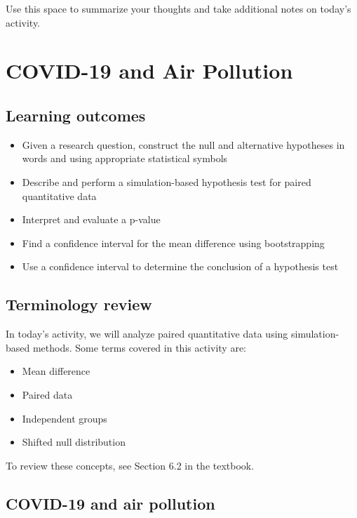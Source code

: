 \documentclass[
]{report}
\begin{document}
Use this space to summarize your thoughts and take additional notes on today's activity.

\hypertarget{covid-19-and-air-pollution}{%
\chapter{COVID-19 and Air Pollution}\label{covid-19-and-air-pollution}}

\hypertarget{learning-outcomes}{%
\section{Learning outcomes}\label{learning-outcomes}}

\begin{itemize}
\item
  Given a research question, construct the null and alternative hypotheses
  in words and using appropriate statistical symbols
\item
  Describe and perform a simulation-based hypothesis test for paired quantitative data
\item
  Interpret and evaluate a p-value
\item
  Find a confidence interval for the mean difference using bootstrapping
\item
  Use a confidence interval to determine the conclusion of a hypothesis test
\end{itemize}

\hypertarget{terminology-review}{%
\section{Terminology review}\label{terminology-review}}

In today's activity, we will analyze paired quantitative data using simulation-based methods. Some terms covered in this activity are:

\begin{itemize}
\item
  Mean difference
\item
  Paired data
\item
  Independent groups
\item
  Shifted null distribution
\end{itemize}

To review these concepts, see Section 6.2 in the textbook.

\hypertarget{covid-19-and-air-pollution-1}{%
\section{COVID-19 and air pollution}\label{covid-19-and-air-pollution-1}}
\end{document}
